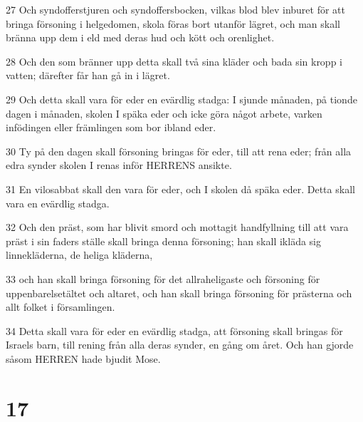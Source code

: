 \par 27 Och syndofferstjuren och syndoffersbocken, vilkas blod blev inburet för att bringa försoning i helgedomen, skola föras bort utanför lägret, och man skall bränna upp dem i eld med deras hud och kött och orenlighet.
\par 28 Och den som bränner upp detta skall två sina kläder och bada sin kropp i vatten; därefter får han gå in i lägret.
\par 29 Och detta skall vara för eder en evärdlig stadga: I sjunde månaden, på tionde dagen i månaden, skolen I späka eder och icke göra något arbete, varken infödingen eller främlingen som bor ibland eder.
\par 30 Ty på den dagen skall försoning bringas för eder, till att rena eder; från alla edra synder skolen I renas inför HERRENS ansikte.
\par 31 En vilosabbat skall den vara för eder, och I skolen då späka eder. Detta skall vara en evärdlig stadga.
\par 32 Och den präst, som har blivit smord och mottagit handfyllning till att vara präst i sin faders ställe skall bringa denna försoning; han skall ikläda sig linnekläderna, de heliga kläderna,
\par 33 och han skall bringa försoning för det allraheligaste och försoning för uppenbarelsetältet och altaret, och han skall bringa försoning för prästerna och allt folket i församlingen.
\par 34 Detta skall vara för eder en evärdlig stadga, att försoning skall bringas för Israels barn, till rening från alla deras synder, en gång om året. Och han gjorde såsom HERREN hade bjudit Mose.

\chapter{17}

